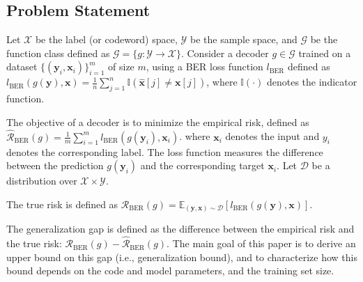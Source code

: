 \documentclass[lettersize,onecolumn]{IEEEtran}
\begin{document}
\subsection{Problem Statement}
Let $\mathcal{X}$ be the label (or codeword) space,  $\mathcal{Y}$ be the sample space, and $\mathcal{G}$ be the function class defined as $\mathcal{G}=\{g: \mathcal{Y} \rightarrow \mathcal{X}\}$. Consider a decoder $g \in \mathcal{G}$ trained on a dataset $\{(\mathbf{y}_i,\mathbf{x}_i)\}_{i=1}^{m}$ of size $m$, using a BER loss function $l_{\text{BER}}$ defined as $l_{\text{BER}}\left(g(\mathbf{y}), \mathbf{x}\right)=\frac{1}{n}\sum_{j=1}^{n} \mathbb{I}(\hat{\mathbf{x}}[j] \neq \mathbf{x}[j])$, 
where $\mathbb{I}(\cdot)$ denotes the indicator function. 

The objective of a decoder is to minimize the empirical risk, defined as $ \hat{\mathcal{R}}_{\text{BER}}(g)=\frac{1}{m} \sum_{i=1}^{m} l_{\text{BER}}\left(g\left(\mathbf{y}_{i}\right), \mathbf{x}_{i}\right)$.
where $\mathbf{x}_i$ denotes the input and $y_{i}$ denotes the corresponding label. The loss function measures the difference between the prediction $g\left(\mathbf{y}_{i}\right)$ and the corresponding target $\mathbf{x}_{i}$. Let $\mathcal{D}$ be a distribution over $\mathcal{X}\times\mathcal{Y}$. 

The true risk is defined as $\mathcal{R}_{\text{BER}}(g)=\mathbb{E}_{(\mathbf{y}, \mathbf{x})\sim \mathcal{D}}\left[l_{\text{BER}}(g(\mathbf{y}), \mathbf{x})\right]$.

The generalization gap is defined as the difference between the empirical risk and the true risk: $\mathcal{R}_{\text{BER}}(g) - \hat{\mathcal{R}}_{\text{BER}}(g)$. The main goal of this paper is to derive an upper bound on this gap (i.e., generalization bound), and to characterize how this bound depends on the code and model parameters, and the training set size.
\end{document}
